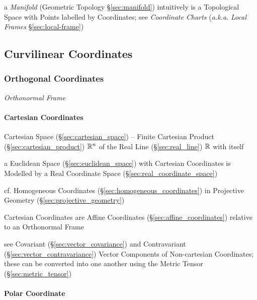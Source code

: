 \fist a \emph{Manifold} (Geometric Topology \S\ref{sec:manifold}) intuitively is
a Topological Space with Points labelled by Coordinates; see \emph{Coordinate
  Charts} (\emph{a.k.a.} \emph{Local Frames} \S\ref{sec:local-frame})



\subsection{Curvilinear Coordinates}\label{sec:curvilinear_coordinates}

\subsubsection{Orthogonal Coordinates}\label{sec:orthogonal_coordinates}

\emph{Orthonormal Frame}



\paragraph{Cartesian Coordinates}\label{sec:cartesian_coordinates}\hfill

Cartesian Space (\S\ref{sec:cartesian_space}) -- Finite Cartesian Product
(\S\ref{sec:cartesian_product}) $\mathbb{R}^n$ of the Real Line
(\S\ref{sec:real_line}) $\mathbb{R}$ with itself

a Euclidean Space (\S\ref{sec:euclidean_space}) with Cartesian Coordinates is
Modelled by a Real Coordinate Space (\S\ref{sec:real_coordinate_space})

cf. Homogeneous Coordinates (\S\ref{sec:homogeneous_coordinates}) in Projective
Geometry (\S\ref{sec:projective_geometry})

Cartesian Coordinates are Affine Coordinates (\S\ref{sec:affine_coordinates})
relative to an Orthonormal Frame

see Covariant (\S\ref{sec:vector_covariance}) and Contravariant
(\S\ref{sec:vector_contravariance}) Vector Components of Non-cartesian
Coordinates; these can be converted into one another using the Metric Tensor
(\S\ref{sec:metric_tensor})



\paragraph{Polar Coordinate}\label{sec:polar_coordinates}\hfill

